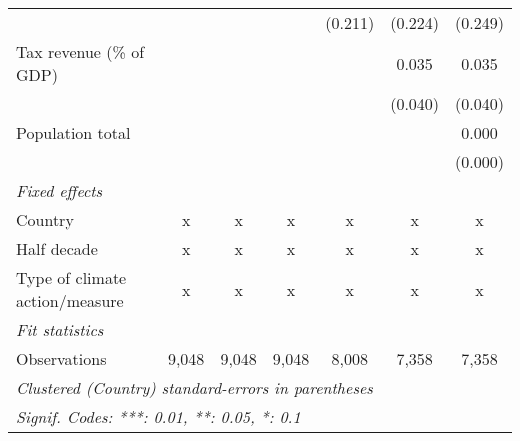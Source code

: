 \begin{tabular}{lcccccc}
                                                                     &         &         &               & (0.211)       & (0.224)       & (0.249)\\   
   Tax revenue (\% of GDP)                                           &         &         &               &               & 0.035         & 0.035\\   
                                                                     &         &         &               &               & (0.040)       & (0.040)\\   
   Population total                                                  &         &         &               &               &               & 0.000\\   
                                                                     &         &         &               &               &               & (0.000)\\   
   \emph{Fixed effects}\\
   Country                                                           & x       & x       & x             & x             & x             & x\\  
   Half decade                                                       & x       & x       & x             & x             & x             & x\\  
   Type of climate action/measure                                    & x       & x       & x             & x             & x             & x\\  
   \midrule \emph{Fit statistics}\\
   Observations                                                      & 9,048   & 9,048   & 9,048         & 8,008         & 7,358         & 7,358\\  
   \midrule
   \multicolumn{7}{l}{\emph{Clustered (Country) standard-errors in parentheses}}\\
   \multicolumn{7}{l}{\emph{Signif. Codes: ***: 0.01, **: 0.05, *: 0.1}}\\
\end{tabular}
\par\endgroup


